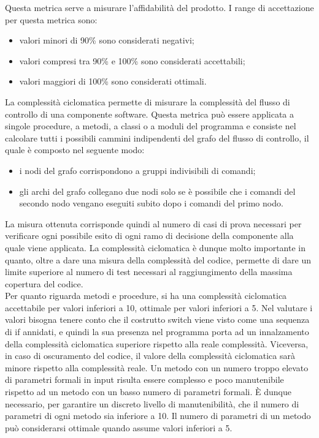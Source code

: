 					Questa metrica serve a misurare l'affidabilità del prodotto.
					I range di accettazione per questa metrica sono:
					\begin{itemize}
					\item valori minori di 90\% sono considerati negativi;
					\item valori compresi tra 90\% e 100\% sono considerati accettabili;
					\item valori maggiori di 100\% sono considerati ottimali.
					\end{itemize}
				La complessità ciclomatica permette di misurare la complessità del flusso di controllo di una componente software. Questa metrica può essere applicata a singole procedure, a metodi, a classi o a moduli del programma e consiste nel calcolare tutti i possibili cammini indipendenti del grafo del flusso di controllo, il quale è composto nel seguente modo:
				\begin{itemize}
					\item i nodi del grafo corrispondono a gruppi indivisibili di comandi;
					\item gli archi del grafo collegano due nodi solo se è possibile che i comandi del secondo nodo vengano eseguiti subito dopo i comandi del primo nodo.
				\end{itemize}
				La misura ottenuta corrisponde quindi al numero di casi di prova necessari per verificare ogni possibile esito di ogni ramo di decisione della componente alla quale viene applicata. La complessità ciclomatica è dunque molto importante in quanto, oltre a dare una misura della complessità del codice, permette di dare un limite superiore al numero di test necessari al raggiungimento della massima copertura del codice.\\
Per quanto riguarda metodi e procedure, si ha una complessità ciclomatica accettabile per valori inferiori a 10, ottimale per valori inferiori a 5. Nel valutare i valori bisogna tenere conto che il costrutto switch viene visto come una sequenza di if annidati, e quindi la sua presenza nel programma porta ad un innalzamento della complessità ciclomatica superiore rispetto alla reale complessità. Viceversa, in caso di oscuramento del codice, il valore della complessità ciclomatica sarà minore rispetto alla complessità reale.
			Un metodo con un numero troppo elevato di parametri formali in input risulta essere complesso e poco manutenibile rispetto ad un metodo con un basso numero di parametri formali. È dunque necessario, per garantire un discreto livello di manutenibilità, che il numero di parametri di ogni metodo sia inferiore a 10. Il numero di parametri di un metodo può considerarsi ottimale quando assume valori inferiori a 5.
